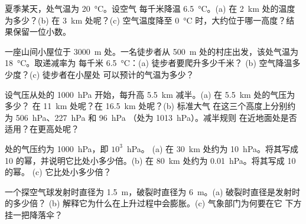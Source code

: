 \begin{exercise}[$\star\star$]\label{exo:g8:the-atmosphere:5}
夏季某天，处气温为 \qty{20}{\degreeCelsius}。设空气
每千米降温 \qty{6.5}{\degreeCelsius}。(a) 在
\qty{2}{km} 处的温度为多少？(b) 在 \qty{3}{km} 处呢？(c) 空气温度降至
\qty{0}{\degreeCelsius} 时，大约位于哪一高度？结果保留一位小数。
\end{exercise}

\begin{exercise}[$\star\star$]\label{exo:g8:the-atmosphere:6}
一座山间小屋位于 \qty{3000}{m} 处。一名徒步者从
\qty{500}{m} 处的村庄出发，该处气温为 \qty{18}{\degreeCelsius}。取递减率为
每千米 \qty{6.5}{\degreeCelsius}：(a) 徒步者要爬升多少千米？
(b) 空气降温多少度？(c) 徒步者在小屋处
可以预计的气温为多少？
\end{exercise}

\begin{exercise}[$\star\star$]\label{exo:g8:the-atmosphere:7}
设气压从处的 \qty{1000}{hPa} 开始，每升高
\qty{5.5}{km} 减半。(a) 在 \qty{5.5}{km} 处的气压为多少？
在 \qty{11}{km} 处呢？在 \qty{16.5}{km} 处呢？(b) 标准大气
在这三个高度上分别约为 \qty{506}{hPa}、\qty{227}{hPa} 和 \qty{96}{hPa}
（处为 \qty{1013}{hPa}）。减半规则
在近地面处是否适用？在更高处呢？
\end{exercise}

\begin{exercise}[$\star\star$]\label{exo:g8:the-atmosphere:8}
处的气压约为 \qty{1000}{hPa}，即 $10^3$~hPa。
(a) 在 \qty{30}{km} 处约为 \qty{10}{hPa}。将其写成
10 的幂，并说明它比处小多少倍。(b) 在
\qty{80}{km} 处约为 \qty{0.01}{hPa}。将其写成 10 的幂。
(c) 它比处小多少倍？
\end{exercise}

\begin{exercise}[$\star\star$]\label{exo:g8:the-atmosphere:9}
一个探空气球发射时直径为 \qty{1.5}{m}，破裂时直径为
\qty{6}{m}。(a) 破裂时直径是发射时的多少倍？
(b) 解释它为什么在上升过程中会膨胀。(c) 气象部门为何要在它
下方挂一把降落伞？
\end{exercise}

